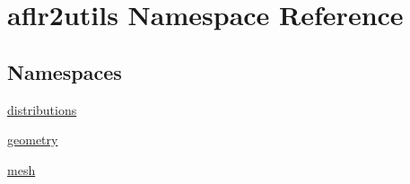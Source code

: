 \hypertarget{namespaceaflr2utils}{\section{aflr2utils Namespace Reference}
\label{namespaceaflr2utils}
}
\subsection*{Namespaces}
\begin{DoxyCompactItemize}
\item 
\hyperlink{namespaceaflr2utils_1_1distributions}{distributions}
\item 
\hyperlink{namespaceaflr2utils_1_1geometry}{geometry}
\item 
\hyperlink{namespaceaflr2utils_1_1mesh}{mesh}
\end{DoxyCompactItemize}
